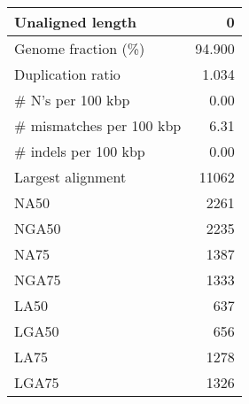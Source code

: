 \documentclass[12pt,a4paper]{article}
\begin{document}
\begin{table}[ht]
\begin{center}
\begin{tabular}{|l*{1}{|r}|}
Unaligned length & 0 \\ \hline
Genome fraction (\%) & 94.900 \\ \hline
Duplication ratio & 1.034 \\ \hline
\# N's per 100 kbp & 0.00 \\ \hline
\# mismatches per 100 kbp & 6.31 \\ \hline
\# indels per 100 kbp & 0.00 \\ \hline
Largest alignment & 11062 \\ \hline
NA50 & 2261 \\ \hline
NGA50 & 2235 \\ \hline
NA75 & 1387 \\ \hline
NGA75 & 1333 \\ \hline
LA50 & 637 \\ \hline
LGA50 & 656 \\ \hline
LA75 & 1278 \\ \hline
LGA75 & 1326 \\ \hline
\end{tabular}
\end{center}
\end{table}
\end{document}
